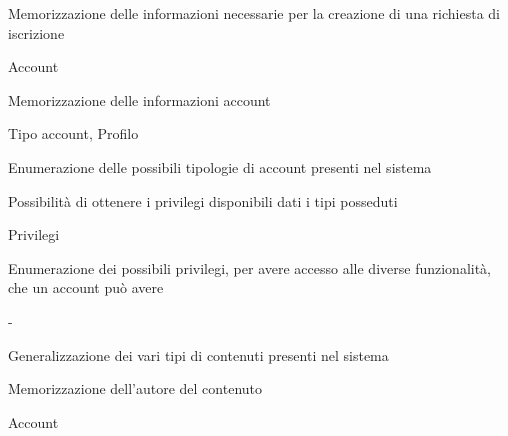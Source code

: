 
{\begin{itemWork}
	\item Memorizzazione delle informazioni necessarie per la creazione di una richiesta di iscrizione
\end{itemWork}}
{\begin{itemWork}
	\item Account
\end{itemWork}}


{\begin{itemWork}
	\item Memorizzazione delle informazioni account
\end{itemWork}}
{\begin{itemWork}
	\item Tipo account, Profilo
\end{itemWork}}


{\begin{itemWork}
	\item Enumerazione delle possibili tipologie di account presenti nel sistema
	\item Possibilità di ottenere i privilegi disponibili dati i tipi posseduti
\end{itemWork}}
{\begin{itemWork}
	\item Privilegi
\end{itemWork}}


{\begin{itemWork}
	\item Enumerazione dei possibili privilegi, per avere accesso alle diverse funzionalità, che un account può avere
\end{itemWork}}
{-}


{\begin{itemWork}
	\item Generalizzazione dei vari tipi di contenuti presenti nel sistema
	\item Memorizzazione dell'autore del contenuto
\end{itemWork}}
{\begin{itemWork}
	\item Account
\end{itemWork}}

